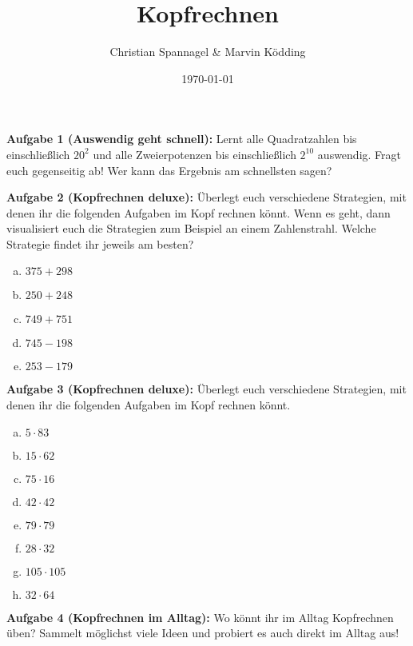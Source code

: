 \documentclass{../cssheet}
\title{Kopfrechnen}
\author{Christian Spannagel \& Marvin Ködding}
\date{\today}
\begin{document}
\printtitle

\textbf{Aufgabe 1 (Auswendig geht schnell):} Lernt alle Quadratzahlen bis einschließlich $20^2$ und alle Zweierpotenzen bis einschließlich $2^{10}$ auswendig. Fragt euch gegenseitig ab! Wer kann das Ergebnis am schnellsten sagen?


\textbf{Aufgabe 2 (Kopfrechnen deluxe):} 
Überlegt euch verschiedene Strategien, mit denen ihr die folgenden Aufgaben im Kopf rechnen könnt. Wenn es geht, dann visualisiert euch die Strategien zum Beispiel an einem Zahlenstrahl. Welche Strategie findet ihr jeweils am besten?
\begin{enumerate}[a)]
\item $375+298$
\item $250+248$
\item $749+751$
\item $745-198$
\item $253-179$
\end{enumerate}

\textbf{Aufgabe 3 (Kopfrechnen deluxe):} 
Überlegt euch verschiedene Strategien, mit denen ihr die folgenden Aufgaben im Kopf rechnen könnt.
\begin{enumerate}[a)]
\item $5\cdot 83$
\item $15\cdot 62$
\item $75\cdot 16$
\item $42\cdot 42$
\item $79\cdot 79$
\item $28\cdot 32$
\item $105\cdot 105$
\item $32\cdot 64$
\end{enumerate}

\textbf{Aufgabe 4 (Kopfrechnen im Alltag):} 
Wo könnt ihr im Alltag Kopfrechnen üben? Sammelt möglichst viele Ideen und probiert es auch direkt im Alltag aus!

\vspace*{10mm}
\printlicense

\printsocials
\end{document}
